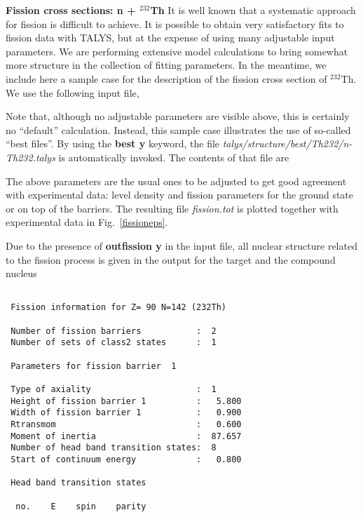 \begin{samplecase}
{\bf Fission cross sections: n + ${}^{232}$Th}\newline
It is well known that a systematic approach for fission is difficult to achieve.
It is possible to obtain
very satisfactory fits to fission data with TALYS, but at the expense of using
many adjustable input parameters.
We are performing extensive model calculations to bring somewhat more structure
in the collection of fitting parameters. In the meantime, we include here a
sample case for the description of the fission cross section of $^{232}$Th.
We use the following input file,


Note that, although no adjustable parameters are visible above,
this is certainly no ``default'' calculation.
Instead, this sample case illustrates the use of so-called ``best files''.
By using the {\bf best y} keyword, the file
{\em talys/structure/best/Th232/n-Th232.talys} is automatically invoked.
The contents of that file are


The above parameters are the usual ones to be adjusted to get good
agreement with experimental data: level density and fission parameters for
the ground state or on top of the barriers.
The resulting file {\em fission.tot} is plotted
together with experimental data in Fig.~\ref{fissioneps}.

Due to the presence of {\bf outfission y} in the input file, all nuclear
structure related to the fission process is given in the output for the target
and the compound nucleus
{\small \begin{verbatim}

 Fission information for Z= 90 N=142 (232Th)

 Number of fission barriers           :  2
 Number of sets of class2 states      :  1

 Parameters for fission barrier  1

 Type of axiality                     :  1
 Height of fission barrier 1          :   5.800
 Width of fission barrier 1           :   0.900
 Rtransmom                            :   0.600
 Moment of inertia                    :  87.657
 Number of head band transition states:  8
 Start of continuum energy            :   0.800

 Head band transition states

  no.    E    spin    parity


\end{verbatim}}
\end{samplecase}
